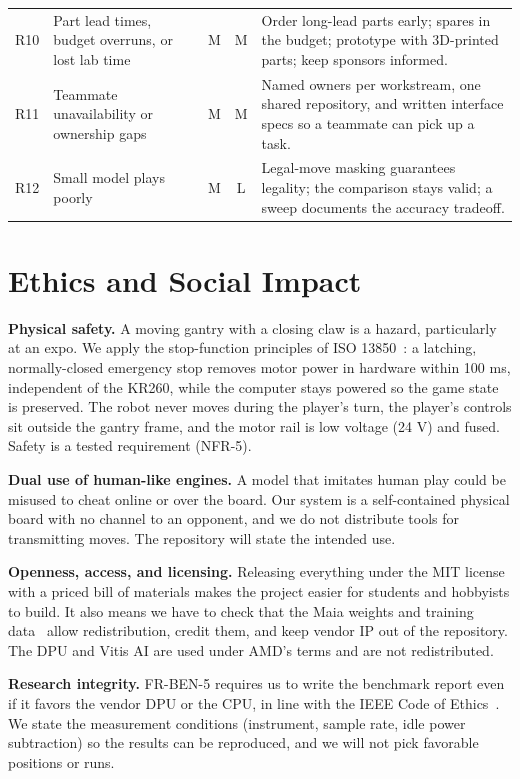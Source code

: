 \documentclass[10pt]{article}
\newcommand{\lead}[1]{\textbf{#1}}
\begin{document}
\begin{table}[H]
\begin{tabularx}{\textwidth}{@{}l P{3.9cm} c c L@{}}
R10 & Part lead times, budget overruns, or lost lab time & M & M & Order long-lead parts early; spares in the budget; prototype with 3D-printed parts; keep sponsors informed. \\
R11 & Teammate unavailability or ownership gaps & M & M & Named owners per workstream, one shared repository, and written interface specs so a teammate can pick up a task. \\
R12 & Small model plays poorly & M & L & Legal-move masking guarantees legality; the comparison stays valid; a sweep documents the accuracy tradeoff. \\
\bottomrule
\end{tabularx}
\end{table}

\section{Ethics and Social Impact}

\lead{Physical safety.} A moving gantry with a closing claw is a hazard, particularly at an expo.
We apply the stop-function principles of ISO 13850~\cite{iso13850}: a latching, normally-closed
emergency stop removes motor power in hardware within 100 ms, independent of the KR260, while the
computer stays powered so the game state is preserved. The robot never moves during the player's
turn, the player's controls sit outside the gantry frame, and the motor rail is low voltage (24 V)
and fused. Safety is a tested requirement (NFR-5).

\lead{Dual use of human-like engines.} A model that imitates human play could be misused to cheat
online or over the board. Our system is a self-contained physical board with no channel to an
opponent, and we do not distribute tools for transmitting moves. The repository will state the
intended use.

\lead{Openness, access, and licensing.} Releasing everything under the MIT license with a priced
bill of materials makes the project easier for students and hobbyists to build. It also means we
have to check that the Maia weights and training data~\cite{maia, maia3} allow redistribution,
credit them, and keep vendor IP out of the repository. The DPU and Vitis AI are used under AMD's
terms and are not redistributed.

\lead{Research integrity.} FR-BEN-5 requires us to write the benchmark report even if it favors the
vendor DPU or the CPU, in line with the IEEE Code of Ethics~\cite{ieee}. We state the measurement
conditions (instrument, sample rate, idle power subtraction) so the results can be reproduced, and
we will not pick favorable positions or runs.
\end{document}
